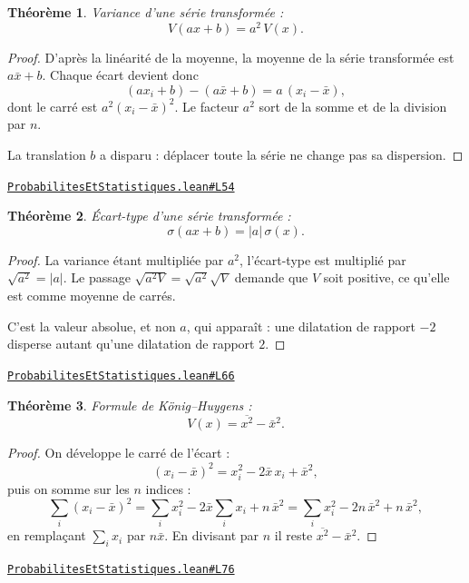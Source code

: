 \documentclass[11pt,a4paper]{article}
\theoremstyle{definition}
\theoremstyle{plain}
\newtheorem{theoreme}{Théorème}
\newcommand{\source}[2]{\par\smallskip\noindent\hfill{\footnotesize\href{#1}{\texttt{#2}}}\par\smallskip}
\begin{document}
\begin{theoreme}
Variance d'une série transformée :
\[ V(ax + b) = a^{2}\,V(x) . \]
\end{theoreme}

\begin{proof}
D'après la linéarité de la moyenne, la moyenne de la série transformée est
$a\bar x + b$. Chaque écart devient donc
\[ (a x_i + b) - (a\bar x + b) = a\,(x_i - \bar x) , \]
dont le carré est $a^{2}(x_i - \bar x)^{2}$. Le facteur $a^{2}$ sort de la somme et de la
division par $n$.

\medskip\noindent
La translation $b$ a disparu : déplacer toute la série ne change pas sa dispersion.
\end{proof}
\source{https://github.com/Commutator-IO/learn-lean/blob/main/cours/02-lycee/09-probabilites-et-statistiques/ProbabilitesEtStatistiques.lean\#L54}{ProbabilitesEtStatistiques.lean\#L54}

\begin{theoreme}
Écart-type d'une série transformée :
\[ \sigma(ax + b) = |a|\,\sigma(x) . \]
\end{theoreme}

\begin{proof}
La variance étant multipliée par $a^{2}$, l'écart-type est multiplié par
$\sqrt{a^{2}} = |a|$. Le passage $\sqrt{a^{2}V} = \sqrt{a^{2}}\sqrt{V}$ demande que $V$
soit positive, ce qu'elle est comme moyenne de carrés.

\medskip\noindent
C'est la valeur absolue, et non $a$, qui apparaît : une dilatation de rapport $-2$
disperse autant qu'une dilatation de rapport $2$.
\end{proof}
\source{https://github.com/Commutator-IO/learn-lean/blob/main/cours/02-lycee/09-probabilites-et-statistiques/ProbabilitesEtStatistiques.lean\#L66}{ProbabilitesEtStatistiques.lean\#L66}

\begin{theoreme}
Formule de König--Huygens :
\[ V(x) = \overline{x^{2}} - \bar x^{2} . \]
\end{theoreme}

\begin{proof}
On développe le carré de l'écart :
\[ (x_i - \bar x)^{2} = x_i^{2} - 2\bar x\,x_i + \bar x^{2} , \]
puis on somme sur les $n$ indices :
\[ \sum_i (x_i - \bar x)^{2}
   = \sum_i x_i^{2} - 2\bar x \sum_i x_i + n\,\bar x^{2}
   = \sum_i x_i^{2} - 2n\,\bar x^{2} + n\,\bar x^{2} , \]
en remplaçant $\sum_i x_i$ par $n\bar x$. En divisant par $n$ il reste
$\overline{x^{2}} - \bar x^{2}$.
\end{proof}
\source{https://github.com/Commutator-IO/learn-lean/blob/main/cours/02-lycee/09-probabilites-et-statistiques/ProbabilitesEtStatistiques.lean\#L76}{ProbabilitesEtStatistiques.lean\#L76}
\end{document}
